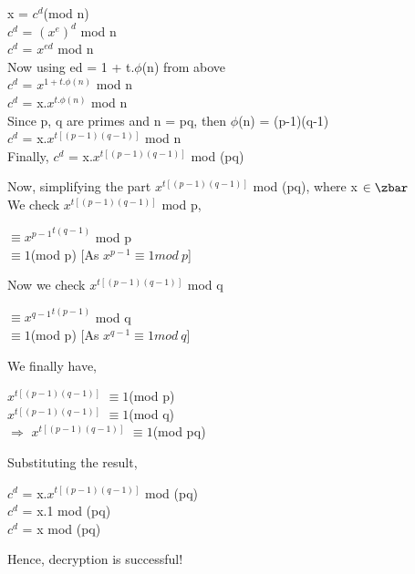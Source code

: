 \documentclass[11pt]{article}
\begin{document}
\begin{center}
    x = $c^d$(mod n)\\
    \vspace{1mm}
    $c^d$ = ${(x^e)}^d$ mod n\\
    \vspace{1mm}
    $c^d$ = $x^{ed}$ mod n\\
    \vspace{1mm}
    Now using ed = 1 + t.$\phi$(n) from above\\
    \vspace{1mm}
    $c^d$ = $x^{1+t.\phi(n)}$ mod n\\
    \vspace{1mm}
    $c^d$ = x.$x^{t.\phi(n)}$ mod n\\
    \vspace{1mm}
    Since p, q are primes and n = pq, then $\phi$(n) = (p-1)(q-1)\\
    \vspace{1mm}
    $c^d$ = x.$x^{t[(p-1)(q-1)]}$ mod n\\
    \vspace{1mm}
    Finally,
    $c^d$ = x.$x^{t[(p-1)(q-1)]}$ mod (pq)\\
\end{center}
Now, simplifying the part $x^{t[(p-1)(q-1)]}$ mod (pq), where x $\in \zbar$ \\
We check $x^{t[(p-1)(q-1)]}$ mod p,
\begin{center}
    $\equiv {x^{p-1}}^{t(q-1)}$ mod p\\
    $\equiv 1 $(mod p) [As $x^{p-1} \equiv 1 mod\ p$]\\
\end{center}
Now we check $x^{t[(p-1)(q-1)]}$ mod q
\begin{center}
    $\equiv {x^{q-1}}^{t(p-1)}$ mod q\\
    $\equiv 1 $(mod p) [As $x^{q-1} \equiv 1 mod\ q$]\\
\end{center}
    
We finally have,
\begin{center}
    $x^{t[(p-1)(q-1)]}$ $\equiv 1 $(mod p)\\
    \vspace{1mm}
    $x^{t[(p-1)(q-1)]}$ $\equiv 1 $(mod q)\\
    \vspace{1mm}
    $\Rightarrow$ $x^{t[(p-1)(q-1)]}$ $\equiv 1 $(mod pq)\\
\end{center}
Substituting the result, 
\begin{center}
     $c^d$ = x.$x^{t[(p-1)(q-1)]}$ mod (pq)\\
      $c^d$ = x.1 mod (pq)\\
      $c^d$ = x mod (pq)\\
\end{center}
Hence, decryption is successful!\\
\end{document}
